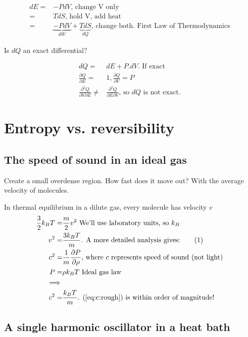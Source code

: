 \documentclass[]{article}
\newcommand\numberthis{\addtocounter{equation}{1}\tag{\theequation}}
\begin{document}
\begin{align*}
dE =& -P dV \text{, change V only}\\
=& T dS \text{, hold V, add heat}\\
=& \underbrace{-P dV}_{dW} + \underbrace{T dS}_{dQ}\text {, change both. First Law of Thermodynamics}
\end{align*}

Is $dQ$ an exact differential?

\begin{align*}
dQ =& dE + P.dV\text{. If exact}\\
\frac{\partial Q}{\partial E}=&1, \frac{\partial Q}{\partial V} = P\\
\frac{\partial^2 Q}{\partial V \partial E} \ne& \frac{\partial^2 Q}{\partial E \partial V}\text{, so $dQ$ is not exact.}
\end{align*}

\section{Entropy vs. reversibility}

\subsection{The speed of sound in an ideal gas}

Create a small overdense region. How fast does it move out? With the average velocity of molecules.

In thermal equilibrium in a dilute gas, every molecule has velocity $v$
\begin{align*}
\frac{3}{2} k_B T =& \frac{m}{2} v^2\text{ We'll use laboratory units, so $k_B$}\\
v^2 =& \frac{3 k_B T}{m}\text{. A more detailed analysis gives:} \numberthis \label{eq:c:rough}\\
c^2 =& \frac{1}{m}\frac{\partial P}{\partial \rho} \text{, where $c$ represents speed of sound (not light)}\\
P =& \rho k_B T\text{ Ideal gas law}\\
\implies&\\
c^2 =& \frac{k_B T}{m}\text{. (\ref{eq:c:rough}) is within order of magnitude!}
\end{align*}


\subsection{A single harmonic oscillator in a heat bath}
\end{document}
